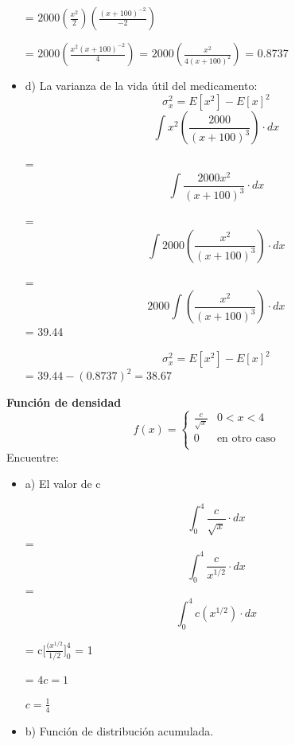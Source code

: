 \documentclass{oxmathproblems}
\begin{document}
\begin{questions}
\begin{itemize}
= 
$2000 (\frac{x^2}{2})(\frac{(x+100)^{-2}}{-2})$

= $2000 (\frac{x^2(x+100)^{-2}}{4})$ =  $2000 (\frac{x^2}{4(x+100)^{2}})$ = 0.8737


\item  d) La varianza de la vida útil del medicamento: 
$$ \sigma_x^2 = E[x^2]-E[x]^2$$ 
\begin{equation}
\int x^2(\frac{2000}{(x+100)^3}) \cdot dx
\end{equation}

=  \begin{equation}
\int \frac{2000x^2}{(x+100)^3} \cdot dx
\end{equation}

=   \begin{equation}
\int 2000 (\frac{x^2}{(x+100)^3}) \cdot dx
\end{equation}

= \begin{equation}
2000 \int  (\frac{x^2}{(x+100)^3}) \cdot dx
\end{equation}
= 39.44

$$ \sigma_x^2 = E[x^2]-E[x]^2$$  = $39.44 - (0.8737)^2 = 38.67$
\end{itemize}

\miquestion\textbf{Función de densidad}
\[ 
f(x) = 
     \begin{cases}
       \frac{c}{\sqrt{x}} & 0 <x < 4 \\
       0 & \text{en otro caso} \\
     \end{cases}
\]
$$$$
Encuentre:  
\begin{itemize}
\item  a) El valor de c

\begin{equation}
\int_{0}^{4} \frac{c}{\sqrt{x}} \cdot dx
\end{equation}
= \begin{equation}
\int_{0}^{4} \frac{c}{x^{1/2}} \cdot dx
\end{equation}
= \begin{equation}
\int_{0}^{4} c(x^{1/2}) \cdot dx
\end{equation}

= c[$\frac{(x^{1/2}}{1/2}]^{4}_{0}$  = 1

= $ 4c = 1 $ 

$ c = \frac{1}{4} $ 

\item  b) Función de distribución acumulada. 


\end{itemize}
\end{questions}
\end{document}
